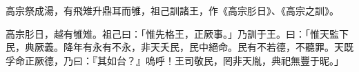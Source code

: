 
\begin{pinyinscope}
高宗祭成湯，有飛雉升鼎耳而雊，祖己訓諸王，作《高宗肜日》、《高宗之訓》。

高宗肜日，越有雊雉。祖己曰：「惟先格王，正厥事。」乃訓于王。曰：「惟天監下民，典厥義。降年有永有不永，非天夭民，民中絕命。民有不若德，不聽罪。天既孚命正厥德，乃曰：『其如台？』嗚呼！王司敬民，罔非天胤，典祀無豐于昵。」


\end{pinyinscope}